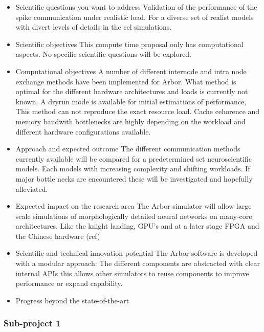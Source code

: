 \documentclass [a4paper, 12pt]{article}
\begin{document}
\begin{itemize}\setlength{\itemsep}{-2pt}
  \item Scientific questions you want to address
Validation of the performance of the spike communication under realistic load. For a diverse set of realist models with divert levels of details in the cel simulations. 
  \item Scientific objectives
This compute time proposal only has computational aspects. No specific scientific questions will be explored.

  \item Computational objectives
A number of different internode and intra node exchange methods have been implemented for Arbor. What method is optimal for the different hardware architectures and loads is currently not known. A dryrun mode is available for initial estimations of performance, This method can not reproduce the exact resource load. Cache cehorence and memory bandwith bottlenecks are highly depending on the workload and different hardware configurations available.

 \item Approach and expected outcome
The different communication methods currently available will be compared for a predetermined set neuroscientific models. Each models with increasing complexity and shifting workloads. If major bottle necks are encountered these will be investigated and hopefully alleviated.

  \item Expected impact on the research area
The Arbor simulator will allow large scale simulations of morphologically detailed neural networks on many-core architectures. Like the knight landing, GPU's and at a later stage FPGA and the Chinese hardware (ref)

  \item Scientific and technical innovation potential
The Arbor software is developed with a modular approach: The different components are abstracted with clear internal APIs this allows other simulators to reuse components to improve performance or expand  capability. 

  \item Progress beyond the state-of-the-art

\end{itemize}

\subsubsection{Sub-project 1}
\end{document}
